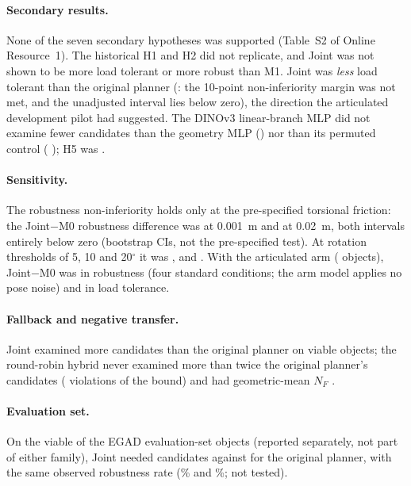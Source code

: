 \paragraph{Secondary results.} None of the seven secondary hypotheses was supported (Table~S2 of Online Resource~1). The historical H1 and H2 did not replicate, and Joint was not shown to be more load tolerant or more robust than M1. Joint was \emph{less} load tolerant than the original planner (\confSSfiveEff: the 10-point non-inferiority margin was not met, and the unadjusted interval lies below zero), the direction the articulated development pilot had suggested. The DINOv3 linear-branch MLP did not examine fewer candidates than the geometry MLP (\confSSsevenEff) nor than its permuted control (\confHfivePerm{} \confHfivePermCI); H5 was \confHfiveSupported.

\paragraph{Sensitivity.} The robustness non-inferiority holds only at the pre-specified torsional friction: the Joint$-$M0 robustness difference was \confTorLowPtwo{} \confTorLowPtwoCI{} at 0.001~m and \confTorHighPtwo{} \confTorHighPtwoCI{} at 0.02~m, both intervals entirely below zero (bootstrap CIs, not the pre-specified test). At rotation thresholds of 5, 10 and 20$^\circ$ it was \confRotFivePtwo, \confRotTenPtwo{} and \confRotTwentyPtwo. With the articulated arm (\confArtObjects{} objects), Joint$-$M0 was \confArtJointMzeroRobust{} \confArtJointMzeroRobustCI{} in robustness (four standard conditions; the arm model applies no pose noise) and \confArtJointMzeroLoad{} \confArtJointMzeroLoadCI{} in load tolerance.

\paragraph{Fallback and negative transfer.} Joint examined more candidates than the original planner on \confNegJoint{} viable objects; the round-robin hybrid never examined more than twice the original planner's candidates (\confHybridViol{} violations of the bound) and had geometric-mean $N_F$ \confHybridNF.

\paragraph{Evaluation set.} On the \evalViable{} viable of the \evalObjects{} EGAD evaluation-set objects (reported separately, not part of either family), Joint needed \evalNFJoint{} candidates against \evalNFMzero{} for the original planner, with the same observed robustness rate (\evalRobustJoint\% and \evalRobustMzero\%; not tested).

